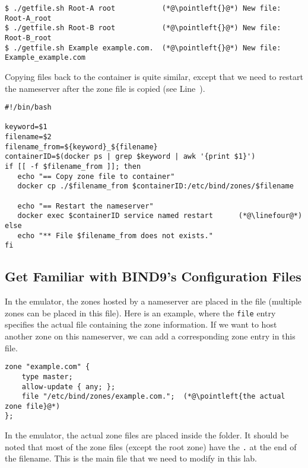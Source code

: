 \begin{lstlisting}
$ ./getfile.sh Root-A root           (*@\pointleft{}@*) New file: Root-A_root
$ ./getfile.sh Root-B root           (*@\pointleft{}@*) New file: Root-B_root
$ ./getfile.sh Example example.com.  (*@\pointleft{}@*) New file: Example_example.com
\end{lstlisting}
 

Copying files back to  the container is quite similar, except that 
we need to restart the nameserver after the zone file is copied (see Line~\linefour).

\begin{lstlisting}[caption=Sending the zone file to container: \texttt{sendzone.sh}]
#!/bin/bash

keyword=$1
filename=$2
filename_from=${keyword}_${filename}
containerID=$(docker ps | grep $keyword | awk '{print $1}')
if [[ -f $filename_from ]]; then
   echo "== Copy zone file to container"
   docker cp ./$filename_from $containerID:/etc/bind/zones/$filename

   echo "== Restart the nameserver"
   docker exec $containerID service named restart      (*@\linefour@*) 
else
   echo "** File $filename_from does not exists."
fi
\end{lstlisting}
 


\subsection{Get Familiar with BIND9's Configuration Files}

In the emulator, the zones hosted by a nameserver are placed 
in the  file (multiple zones
can be placed in this file). Here is 
an example, where the \texttt{file} entry specifies
the actual file containing the zone information.  If we want 
to host another zone on this nameserver, we can add a corresponding
zone entry in this file. 

\begin{lstlisting}
zone "example.com" { 
    type master; 
    allow-update { any; }; 
    file "/etc/bind/zones/example.com.";  (*@\pointleft{the actual zone file}@*) 
};
\end{lstlisting}
 
In the emulator, the actual zone files are placed inside the 
 folder. It should be noted that 
most of the zone files (except the root zone) have the \texttt{.} 
at the end of the filename.  This is the main file that we need
to modify in this lab. 


